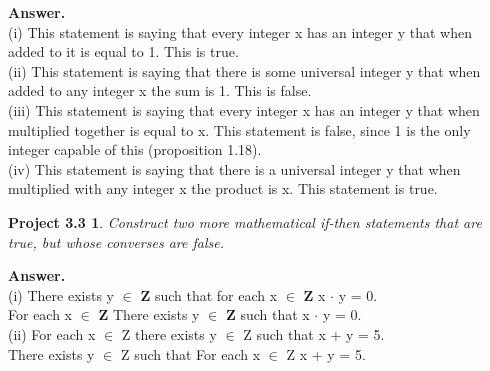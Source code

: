 \documentclass[12pt]{amsart}
\begin{document}
\noindent
\textbf{Answer.}
\\(i) This statement is saying that every integer x has an integer y that when added to it is equal to 1. This is true.
\\(ii) This statement is saying that there is some universal integer y that when added to any integer x the sum is 1. This is false.
\\(iii) This statement is saying that every integer x has an integer y that when multiplied together is equal to x. This statement is false, since 1 is the only integer capable of this (proposition 1.18).
\\(iv) This statement is saying that there is a universal integer y that when multiplied with any integer x the product is x. This statement is true.

\newtheorem*{proj3.3}{Project 3.3}
\begin{proj3.3}
Construct two more mathematical if-then statements that are true, but whose converses are false.
\end{proj3.3}

\noindent
\textbf{Answer.}
\\(i) There exists y $\in$ \textbf{Z} such that for each x $\in$ \textbf{Z} x $\cdot$ y = 0.
\\    For each x $\in$ \textbf{Z} There exists y $\in$ \textbf{Z} such that x $\cdot$ y = 0.
\\(ii) For each x $\in$ Z there exists y $\in$ Z such that x + y = 5.
\\     There exists y $\in$ Z such that For each x $\in$ Z x + y = 5.
\end{document}
